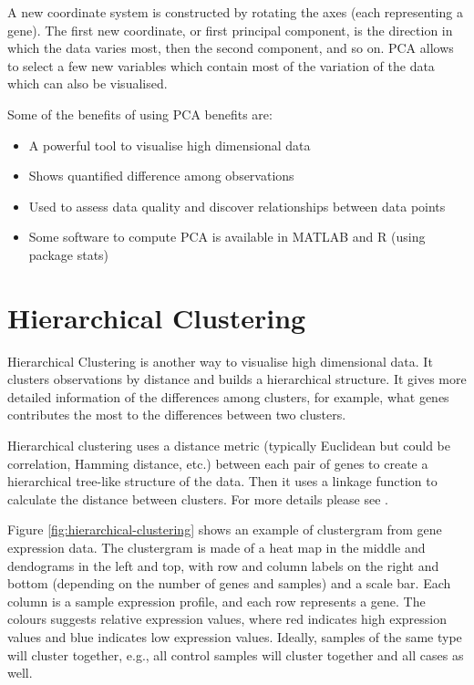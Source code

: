 \documentclass[11pt, oneside]{article}   	%
\begin{document}
A new coordinate system is constructed by rotating the axes (each representing a gene). The first new coordinate, or first principal component, is the direction in which the data varies most, then the second component, and so on. PCA allows to select a few new variables which contain most of the variation of the data which can also be visualised.


Some of the benefits of using PCA benefits are:

\begin{itemize}

   \item A powerful tool to visualise high dimensional data 

   \item Shows quantified difference among observations

   \item Used to assess data quality and discover relationships between data points
   
   \item Some software to compute PCA is available in MATLAB and R (using package stats)

\end{itemize}





\section{Hierarchical Clustering}

Hierarchical Clustering is another way to visualise high dimensional data. 
It clusters observations by distance and builds a hierarchical structure.
It gives more detailed information of the differences among clusters, for example, what genes contributes the most to the differences between two clusters.


Hierarchical clustering uses a distance metric (typically Euclidean but could be correlation, Hamming distance, etc.) between each pair of genes to create a hierarchical tree-like structure of the data. Then it uses a linkage function to calculate the distance between clusters. For more details please see \cite{Clustergram}. 


Figure \ref{fig:hierarchical-clustering} shows an example of clustergram from gene expression data.
The clustergram is made of a heat map in the middle and dendograms in the left and top, with row and column labels on the right and bottom (depending on the number of genes and samples) and a scale bar. 
Each column is a sample expression profile, and each row represents a gene.
The colours suggests relative expression values, where red indicates high expression values and blue indicates low expression values. 
Ideally, samples of the same type will cluster together, e.g., all control samples will cluster together and all cases as well.
\end{document}
